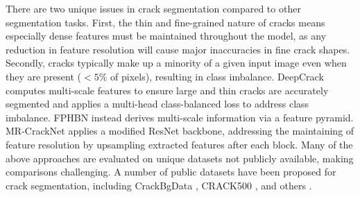 \documentclass[a4paper,12pt]{report}
\begin{document}
There are two unique issues in crack segmentation compared to other segmentation tasks. First, the thin and fine-grained nature of cracks means especially dense features must be maintained throughout the model, as any reduction in feature resolution will cause major inaccuracies in fine crack shapes. Secondly, cracks typically make up a minority of a given input image even when they are present ($<5\%$ of pixels), resulting in class imbalance. DeepCrack \cite{liu_deepcrack_2019} computes multi-scale features to ensure large and thin cracks are accurately segmented and applies a multi-head class-balanced loss to address class imbalance. FPHBN \cite{yang_feature_2019} instead derives multi-scale information via a feature pyramid. MR-CrackNet \cite{nayyeri_multi-resolution_2021} applies a modified ResNet \cite{he_deep_2015} backbone, addressing the maintaining of feature resolution by upsampling extracted features after each block.
Many of the above approaches are evaluated on unique datasets not publicly available, making comparisons challenging. A number of public datasets have been proposed for crack segmentation, including CrackBgData \cite{nayyeri_multi-resolution_2021}, CRACK500 \cite{yang_feature_2019}, and others \cite{eisenbach_how_2017} \cite{shi_automatic_2016} \cite{amhaz_automatic_2016} \cite{zou_cracktree_2012}.
\end{document}
